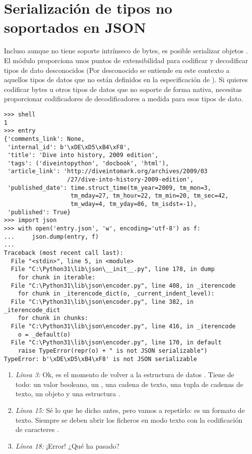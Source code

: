 \section{Serialización de tipos no soportados en JSON}

Incluso aunque  no tiene soporte intrínseco de bytes, es posible serializar objetos . El módulo  proporciona unos puntos de extensibilidad para codificar y decodificar tipos de dato desconocidos (Por desconocido se entiende en este contexto a aquellos tipos de datos que no están definidos en la especificación de ). Si quieres codificar bytes u otros tipos de datos que  no soporte de forma nativa, necesitas proporcionar codificadores de decodificadores a medida para esos tipos de dato.

\noindent\begin{minipage}{\textwidth}
\begin{lstlisting}[mathescape=True]
>>> shell
1
>>> entry
{'comments_link': None,
 'internal_id': b'\xDE\xD5\xB4\xF8',
 'title': 'Dive into history, 2009 edition',
 'tags': ('diveintopython', 'docbook', 'html'),
 'article_link': 'http://diveintomark.org/archives/2009/03
                  /27/dive-into-history-2009-edition',
 'published_date': time.struct_time(tm_year=2009, tm_mon=3, 
                   tm_mday=27, tm_hour=22, tm_min=20, tm_sec=42, 
                   tm_wday=4, tm_yday=86, tm_isdst=-1),
 'published': True}
>>> import json
>>> with open('entry.json', 'w', encoding='utf-8') as f:
...     json.dump(entry, f)
... 
Traceback (most recent call last):
  File "<stdin>", line 5, in <module>
  File "C:\Python31\lib\json\__init__.py", line 178, in dump
    for chunk in iterable:
  File "C:\Python31\lib\json\encoder.py", line 408, in _iterencode
    for chunk in _iterencode_dict(o, _current_indent_level):
  File "C:\Python31\lib\json\encoder.py", line 382, in _iterencode_dict
    for chunk in chunks:
  File "C:\Python31\lib\json\encoder.py", line 416, in _iterencode
    o = _default(o)
  File "C:\Python31\lib\json\encoder.py", line 170, in default
    raise TypeError(repr(o) + " is not JSON serializable")
TypeError: b'\xDE\xD5\xB4\xF8' is not JSON serializable
\end{lstlisting}
\end{minipage}

\begin{enumerate}

\item \emph{Línea 3:} Ok, es el momento de volver a la estructura de datos . Tiene de todo: un valor booleano, un , una cadena de texto, una tupla de cadenas de texto, un objeto  y una estructura .

\item \emph{Línea 15:} Sé lo que he dicho antes, pero vamos a repetirlo:  es un formato de texto. Siempre se deben abrir los ficheros  en modo texto con la codificación de caracteres .

\item \emph{Línea 18:} ¡Error! ¿Qué ha pasado?

\end{enumerate}


